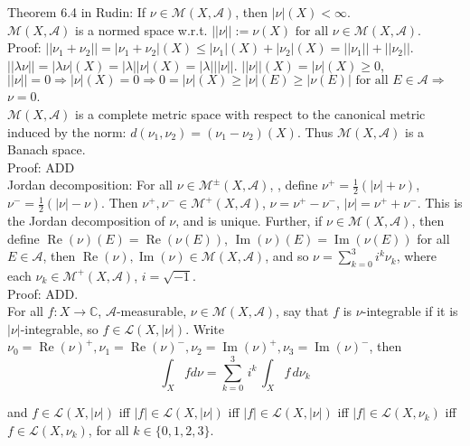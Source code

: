 \documentclass[12pt]{article}
\newcommand{\fall}[0] { \textrm{ for all } }
\newcommand{\complexes}[0] { \mathbb{C}}
\newcommand{\A}[0] { \mathcal{A} }
\newcommand{\M}[0] { \mathcal{M} }
\newcommand{\Ell}[0] { \mathcal{L} }
\renewcommand{\Re}{ \operatorname{Re} }
\renewcommand{\Im}{ \operatorname{Im} }
\newcommand{\rimply}[0] { \Rightarrow }
\newcommand{\rarw}[0] { \rightarrow }
\begin{document}
Theorem 6.4 in Rudin: If $\nu \in \M(X, \A)$, then $|\nu|(X) < \infty$. \\

$\M(X, \A)$ is a normed space w.r.t. $||\nu|| := \nu(X) \fall \nu \in \M(X, \A)$. \\

\noindent
Proof: $|| \nu_1 + \nu_2 || = |\nu_1 + \nu_2|(X) \le |\nu_1|(X) + |\nu_2|(X) = ||\nu_1|| + ||\nu_2|| $. $||\lambda \nu|| = |\lambda \nu|(X) = |\lambda| |\nu|(X) = |\lambda| ||\nu||$. $||\nu||(X) = |\nu|(X) \ge 0$, $||\nu|| = 0 \rimply |\nu|(X) = 0 \rimply 0 = |\nu|(X) \ge |\nu|(E) \ge |\nu(E)| \fall E \in \A \rimply$ $\nu = 0$. \\

$\M(X, \A)$ is a complete metric space with respect to the canonical metric induced by the norm: $d(\nu_1,\nu_2) = (\nu_1-\nu_2)(X)$. Thus $\M(X, \A)$ is a Banach space. \\

\noindent
Proof: ADD \\

Jordan decomposition: For all $ \nu \in \M^\pm(X, \A)$, , define $\nu^+ = \frac{1}{2}(|\nu| + \nu)$, $\nu^- = \frac{1}{2}(|\nu| - \nu)$. Then $\nu^+, \nu^- \in  \M^+(X, \A)$, $\nu = \nu^+ - \nu^-$, $|\nu| = \nu^+ + \nu^-$. This is the Jordan decomposition of $\nu$, and is unique. Further, if $\nu \in \M(X, \A)$, then define $\Re(\nu)(E) = \Re(\nu(E))$, $\Im(\nu)(E) = \Im(\nu(E))$ for all $E \in \A$, then $\Re(\nu), \Im(\nu) \in \M(X, \A)$, and so $\nu = \sum_{k=0}^3 i^k \nu_k$, where each $\nu_k \in \M^+(X, \A)$, $i = \sqrt{-1}$.\\

\noindent
Proof: ADD. \\


For all $f:X \rarw \complexes$, $\A$-measurable, $\nu \in \M(X, \A)$, say that $f$ is $\nu$-integrable if it is $|\nu|$-integrable, so $f \in \Ell (X, |\nu|)$. Write $\nu_0 = \Re(\nu)^+, \nu_1 = \Re(\nu)^-, \nu_2 = \Im(\nu)^+, \nu_3 = \Im(\nu)^-$, then \\

$$
\int_X f d\nu = \sum_{k=0}^3 \, i^k \, \int_X f \, d\nu_k
$$

\noindent
and $f \in \Ell (X, |\nu|)$ iff $|f| \in \Ell (X, |\nu|)$ iff $|f| \in \Ell (X, |\nu|)$ iff $|f| \in \Ell (X, \nu_k)$ iff $f \in \Ell (X, \nu_k)$, for all $k \in \{0,1,2,3\}$. \\
\end{document}
